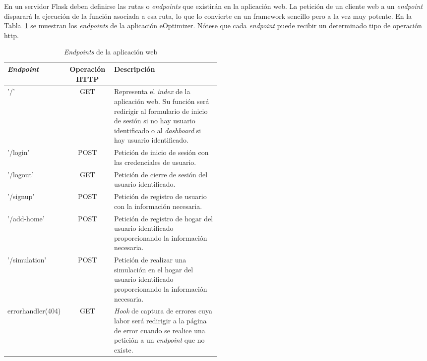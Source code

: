 En un servidor Flask deben definirse las rutas o \textit{endpoints} que existirán en la aplicación web. La petición de un cliente web a un \textit{endpoint} disparará la ejecución de la función asociada a esa ruta, lo que lo convierte en un framework sencillo pero a la vez muy potente. En la Tabla~\ref{tab:endpoints} se muestran los \textit{endpoints} de la aplicación eOptimizer. Nótese que cada \textit{endpoint} puede recibir un determinado tipo de operación http.
\begin{table}[hp]
        \centering
        \begin{tabular}{|l|c|p{0.5\linewidth}|}
                \hline
                \textbf{\textit{Endpoint}} & \textbf{Operación HTTP} & \textbf{Descripción}\\ \hline
                '/' & GET & Representa el \textit{index} de la aplicación web. Su función será redirigir al formulario de inicio de sesión si no hay usuario identificado o al \textit{dashboard} si hay usuario identificado.\\ \hline
                '/login' & POST & Petición de inicio de sesión con las credenciales de usuario. \\ \hline
                '/logout' & GET & Petición de cierre de sesión del usuario identificado. \\ \hline
                '/signup' & POST & Petición de registro de usuario con la información necesaria. \\ \hline
                '/add-home' & POST & Petición de registro de hogar del usuario identificado proporcionando la información necesaria. \\ \hline
                '/simulation' & POST & Petición de realizar una simulación en el hogar del usuario identificado proporcionando la información necesaria. \\ \hline
                errorhandler(404) & GET & \textit{Hook} de captura de errores cuya labor será redirigir a la página de error cuando se realice una petición a un \textit{endpoint} que no existe. \\ \hline
             \end{tabular}
        \caption{\textit{Endpoints} de la aplicación web}
        \label{tab:endpoints}
\end{table}

